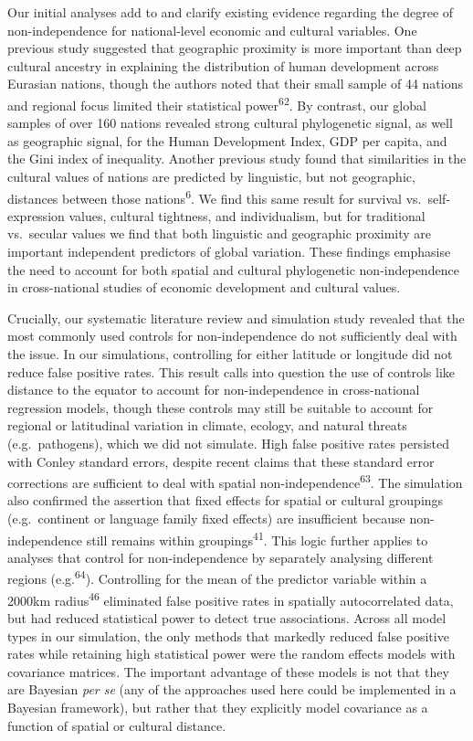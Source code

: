 \documentclass[
  man,floatsintext]{apa6}
\begin{document}
Our initial analyses add to and clarify existing evidence regarding the degree of non-independence for national-level economic and cultural variables. One previous study suggested that geographic proximity is more important than deep cultural ancestry in explaining the distribution of human development across Eurasian nations, though the authors noted that their small sample of 44 nations and regional focus limited their statistical power\textsuperscript{62}. By contrast, our global samples of over 160 nations revealed strong cultural phylogenetic signal, as well as geographic signal, for the Human Development Index, GDP per capita, and the Gini index of inequality. Another previous study found that similarities in the cultural values of nations are predicted by linguistic, but not geographic, distances between those nations\textsuperscript{6}. We find this same result for survival vs.~self-expression values, cultural tightness, and individualism, but for traditional vs.~secular values we find that both linguistic and geographic proximity are important independent predictors of global variation. These findings emphasise the need to account for both spatial and cultural phylogenetic non-independence in cross-national studies of economic development and cultural values.

Crucially, our systematic literature review and simulation study revealed that the most commonly used controls for non-independence do not sufficiently deal with the issue. In our simulations, controlling for either latitude or longitude did not reduce false positive rates. This result calls into question the use of controls like distance to the equator to account for non-independence in cross-national regression models, though these controls may still be suitable to account for regional or latitudinal variation in climate, ecology, and natural threats (e.g.~pathogens), which we did not simulate. High false positive rates persisted with Conley standard errors, despite recent claims that these standard error corrections are sufficient to deal with spatial non-independence\textsuperscript{63}. The simulation also confirmed the assertion that fixed effects for spatial or cultural groupings (e.g.~continent or language family fixed effects) are insufficient because non-independence still remains within groupings\textsuperscript{41}. This logic further applies to analyses that control for non-independence by separately analysing different regions (e.g.\textsuperscript{64}). Controlling for the mean of the predictor variable within a 2000km radius\textsuperscript{46} eliminated false positive rates in spatially autocorrelated data, but had reduced statistical power to detect true associations. Across all model types in our simulation, the only methods that markedly reduced false positive rates while retaining high statistical power were the random effects models with covariance matrices. The important advantage of these models is not that they are Bayesian \emph{per se} (any of the approaches used here could be implemented in a Bayesian framework), but rather that they explicitly model covariance as a function of spatial or cultural distance.
\end{document}
